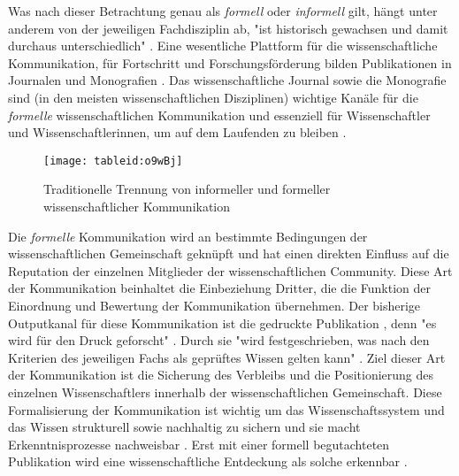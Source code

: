 Was nach dieser Betrachtung genau als \textit{formell} oder \textit{informell} gilt, hängt unter anderem von der jeweiligen Fachdisziplin ab, "ist historisch gewachsen und damit durchaus unterschiedlich" \cite{Hanekop_2014}. Eine wesentliche Plattform für die wissenschaftliche Kommunikation, für Fortschritt und Forschungsförderung bilden Publikationen in Journalen und Monografien \cite{cope2014future} \cite{fox_1983_publication}. Das wissenschaftliche Journal sowie die Monografie sind (in den meisten wissenschaftlichen Disziplinen) wichtige Kanäle für die \textit{formelle} wissenschaftlichen Kommunikation und essenziell für Wissenschaftler und Wissenschaftlerinnen, um auf dem Laufenden zu bleiben \cite{cope2014future}.

\begin{figure}[h!]
\texttt{[image: tableid:o9wBj]}
\caption{Traditionelle Trennung von informeller und formeller wissenschaftlicher Kommunikation}
\end{figure}

Die \textit{formelle} Kommunikation wird an bestimmte Bedingungen der wissenschaftlichen Gemeinschaft geknüpft und hat einen direkten Einfluss auf die Reputation der einzelnen Mitglieder der wissenschaftlichen Community. Diese Art der Kommunikation beinhaltet die Einbeziehung Dritter, die die Funktion der Einordnung und Bewertung der Kommunikation übernehmen. Der bisherige Outputkanal für diese Kommunikation ist die gedruckte Publikation \cite{winkler_2011_anforderungen}, denn "es wird für den Druck geforscht" \cite{luhmann_1997_gesellschaft}. Durch sie "wird festgeschrieben, was nach den Kriterien des jeweiligen Fachs als geprüftes Wissen gelten kann" \cite{bbaw_publizieren_2015}. Ziel dieser Art der Kommunikation ist die Sicherung des Verbleibs und die Positionierung des einzelnen Wissenschaftlers innerhalb der wissenschaftlichen Gemeinschaft. Diese Formalisierung der Kommunikation ist wichtig um das Wissenschaftssystem und das Wissen strukturell sowie nachhaltig zu sichern und sie macht Erkenntnisprozesse nachweisbar \cite{kaden_2009_library}. Erst mit einer formell begutachteten Publikation wird eine wissenschaftliche Entdeckung als solche erkennbar \cite{brembs2015open}.


